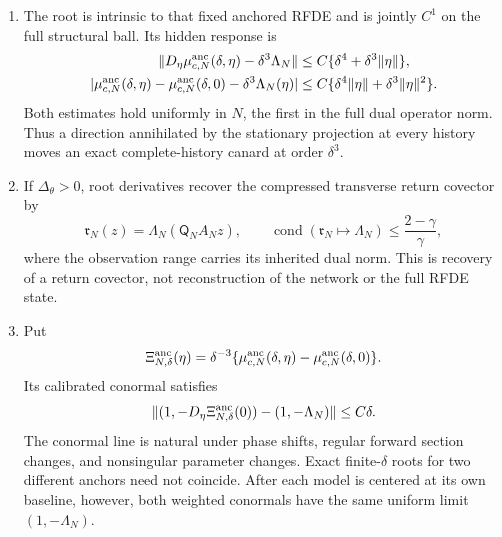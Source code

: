 \begin{theorem}
\begin{enumerate}[label=\textup{(\roman*)}]
\item The root is intrinsic to that fixed anchored RFDE and is jointly
\(C^1\) on the full structural ball.  Its hidden response is
\begin{align}
 \|D_\eta\mu_{c,N}^{\rm anc}(\delta,\eta)
       -\delta^3\Lambda_N\|
 &\le C\{\delta^4+\delta^3\|\eta\|\},             \label{eq:intro-root-jet}\\
 |\mu_{c,N}^{\rm anc}(\delta,\eta)
  -\mu_{c,N}^{\rm anc}(\delta,0)-\delta^3\Lambda_N(\eta)|
 &\le C\{\delta^4\|\eta\|+\delta^3\|\eta\|^2\}. \label{eq:intro-root-increment}
\end{align}
Both estimates hold uniformly in \(N\), the first in the full dual operator
norm.  Thus a direction annihilated by the stationary projection at every
history moves an exact complete-history canard at order \(\delta^3\).

\item If \(\Delta_\theta>0\), root derivatives recover the compressed
transverse return covector by
\begin{equation}
 \mathfrak r_N(z)=\Lambda_N(\mathsf Q_NA_Nz),
 \qquad
 \operatorname{cond}(\mathfrak r_N\mapsto\Lambda_N)
 \le\frac{2-\gamma}{\gamma},                       \label{eq:intro-dual-reconstruction}
\end{equation}
where the observation range carries its inherited dual norm.  This is
recovery of a return covector, not reconstruction of the network or the full
RFDE state.

\item Put
\begin{equation}
 \Xi_{N,\delta}^{\rm anc}(\eta)
 =\delta^{-3}\{\mu_{c,N}^{\rm anc}(\delta,\eta)
                 -\mu_{c,N}^{\rm anc}(\delta,0)\}.
\end{equation}
Its calibrated conormal satisfies
\begin{equation}
 \|(1,-D_\eta\Xi_{N,\delta}^{\rm anc}(0))
      -(1,-\Lambda_N)\|\le C\delta.                \label{eq:intro-conormal-limit}
\end{equation}
The conormal line is natural under phase shifts, regular forward section
changes, and nonsingular parameter changes.  Exact finite-\(\delta\) roots
for two different anchors need not coincide.  After each model is centered
at its own baseline, however, both weighted conormals have the same uniform
limit \((1,-\Lambda_N)\).
\end{enumerate}
\end{theorem}

